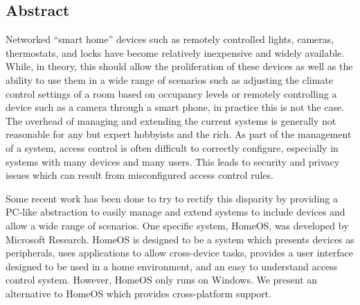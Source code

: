 \subsection*{Abstract}
Networked ``smart home'' devices such as remotely controlled lights, cameras,
thermostats, and locks have become relatively inexpensive and widely available.
While, in theory, this should allow the proliferation of these devices as well
as the ability to use them in a wide range of scenarios such as adjusting the
climate control settings of a room based on occupancy levels or remotely
controlling a device such as a camera through a smart phone, in practice this is
not the case. The overhead of managing and extending the current systems is
generally not reasonable for any but expert hobbyists and the rich. As part of
the management of a system, access control is often difficult to correctly
configure, especially in systems with many devices and many users. This leads to
security and privacy issues which can result from misconfigured access control
rules.

Some recent work has been done to try to rectify this disparity by providing a
PC-like abstraction to easily manage and extend systems to include devices and
allow a wide range of scenarios. One specific system, HomeOS, was developed by
Microsoft Research. HomeOS is designed to be a system which presents devices as
peripherals, uses applications to allow cross-device tasks, provides a user
interface designed to be used in a home environment, and an easy to understand
access control system. However, HomeOS only runs on Windows.  We present an
alternative to HomeOS which provides cross-platform support.